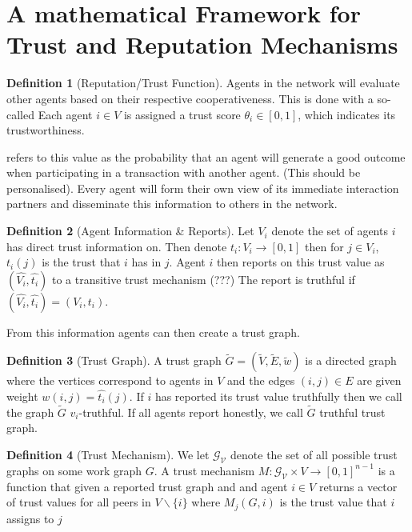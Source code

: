 \documentclass[11pt,a4paper]{report}
\theoremstyle{definition}
\newtheorem{definition}{Definition}[section]
\theoremstyle{theorem}
\theoremstyle{proposition}
\theoremstyle{corollary}
\theoremstyle{lemma}
\theoremstyle{example}
\theoremstyle{remark}
\begin{document}
\section{A mathematical Framework for Trust and Reputation Mechanisms}
\label{sec:A mathematical Framework for Trust and Reputation Mechanisms}
\begin{definition}[Reputation/Trust Function]
Agents in the network will evaluate other agents based on their respective cooperativeness. This is done with a so-called 
Each agent $i\in{}V$ is assigned a trust score $\theta_i\in[0,1]$, which indicates its trustworthiness. 
\end{definition}

\noindent{}\cite{Hybrid Transitive Trust Mechanisms} refers to this value as the probability that an agent will generate a good outcome when participating in a transaction with another agent. (This should be personalised). Every agent will form their own view of its immediate interaction partners and disseminate this information to others in the network. 

\begin{definition}[Agent Information \& Reports]
Let $V_i$ denote the set of agents $i$ has direct trust information on. Then denote $t_i:V_i\rightarrow{}[0,1]$ then for $j\in{}V_i$, $t_i(j)$  is the trust that $i$ has in $j$. Agent $i$ then reports on this trust value as $(\hat{V_i}, \hat{t_i})$ to a transitive trust mechanism (???) The report is truthful if $(\hat{V_i},\hat{t_i})=(V_i, t_i)$. 
\end{definition}
From this information agents can then create a trust graph.

\begin{definition}[Trust Graph]
A trust graph $\tilde{G}=(\tilde{V},\tilde{E},\tilde{w})$ is a directed graph where the vertices correspond to agents in $V$ and the edges $(i,j)\in{}E$ are given weight $w(i,j)=\hat{t_i}(j)$. If $i$ has reported its trust value truthfully then we call the graph $\tilde{G}$ $v_i$-truthful. If all agents report honestly, we call $\tilde{G}$ truthful trust graph.  
\end{definition}

\begin{definition}[Trust Mechanism]
We let $\mathcal{G}_{\mathcal{V}}$ denote the set of all possible trust graphs on some work graph $G$. A trust mechanism $M:\mathcal{G}_{\mathcal{V}}\times{}V\rightarrow{}[0,1]^{n-1}$ is a function that given a reported trust graph and and agent $i\in{}V$ returns a vector of trust values for all peers in $V\backslash\{i\}$ where $M_j(G,i)$ is the trust value that $i$ assigns to $j$ 
\end{definition}
\end{document}
